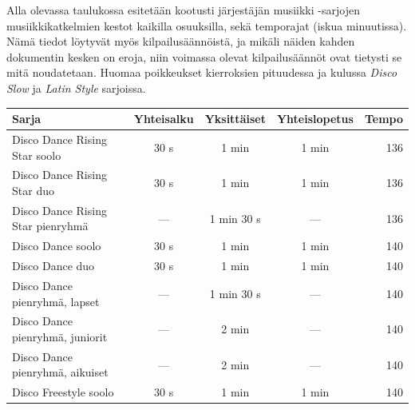 \documentclass[12pt, a4paper, oneside]{article}
\begin{document}
Alla olevassa taulukossa esitetään kootusti järjestäjän musiikki -sarjojen musiikkikatkelmien kestot kaikilla osuuksilla,
sekä temporajat (iskua minuutissa).
Nämä tiedot löytyvät myös kilpailusäännöistä,
ja mikäli näiden kahden dokumentin kesken on eroja,
niin voimassa olevat kilpailusäännöt ovat tietysti se mitä noudatetaan.
Huomaa poikkeukset kierroksien pituudessa ja kulussa \textit{Disco Slow} ja \textit{Latin Style} sarjoissa.
\begin{table}[ht]
    \centering
    \setlength\tabcolsep{9pt}
    \small
    \renewcommand{\arraystretch}{1.5}
    \begin{tabular}{@{\hspace{0.25cm}}lcccr@{\hspace{0.25cm}}}
        \toprule
        \textbf{Sarja}                                  & \textbf{Yhteisalku} & \textbf{Yksittäiset} & \textbf{Yhteislopetus} & \textbf{Tempo} \\ \midrule
        Disco Dance Rising Star soolo                   & 30 s                & 1 min                & 1 min                  & 136            \\
        Disco Dance Rising Star duo                     & 30 s                & 1 min                & 1 min                  & 136            \\
        Disco Dance Rising Star pienryhmä               & ---                 & 1 min 30 s           & ---                    & 136            \\
        Disco Dance soolo                               & 30 s                & 1 min                & 1 min                  & 140            \\
        Disco Dance duo                                 & 30 s                & 1 min                & 1 min                  & 140            \\
        Disco Dance pienryhmä, lapset                   & ---                 & 1 min 30 s           & ---                    & 140            \\
        Disco Dance pienryhmä, juniorit                 & ---                 & 2 min                & ---                    & 140            \\
        Disco Dance pienryhmä, aikuiset                 & ---                 & 2 min                & ---                    & 140            \\
        Disco Freestyle soolo                           & 30 s                & 1 min                & 1 min                  & 140            \\

\end{tabular}
\end{table}
\end{document}
